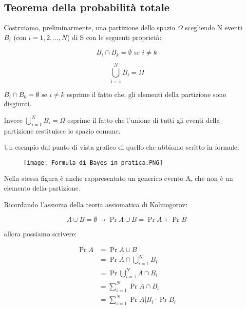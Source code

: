 \subsection{Teorema della probabilità totale} 

Costruiamo, preliminarmente, una partizione dello spazio $\Omega$ scegliendo N eventi $B_i$ (con $i = 1, 2, ..., N$) 
di S con le seguenti proprietà: 

{
    \Large 
    \begin{equation}
      B_i \cap B_k = \emptyset \text{ se } i \neq k   
    \end{equation}
}

{
    \Large 
    \begin{equation}
        \bigcup_{i = 1} ^{N} B_i = \Omega 
    \end{equation}
}

$B_i \cap B_k = \emptyset \text{ se } i \neq k$ esprime il fatto che, gli elementi della partizione sono disgiunti. \newline 

Invece $\bigcup_{i = 1} ^{N} B_i = \Omega$ esprime il fatto che l'unione di tutti gli eventi della partizione restituisce lo spazio comune. \newline 

Un esempio dal punto di vista grafico di quello che abbiamo scritto in formule: 

\begin{figure}[h]
    \centering
    \texttt{[image: Formula di Bayes in pratica.PNG]}
\end{figure} 

\newpage 

Nella stessa figura è anche rappresentato un generico evento A, che non è un elemento della partizione. \newline 

Ricordando l'assioma della teoria assiomatica di Kolmogorov: 

{
    \Large 
    \begin{equation}
        A \cup B = \emptyset 
        \rightarrow 
        \Pr{A \cup B} = \Pr{A} + \Pr{B}
    \end{equation}
}

allora possiamo scrivere: 

{
    \Large 
    \begin{equation}
        \begin{split}
            \Pr{A} 
            &= 
            \Pr{A \cup B} 
            \\ 
            &= 
            \Pr{A \cap \bigcup_{i =1}^{N} B_i}
            \\ 
            &= 
            \Pr{\bigcup_{i =1}^{N} A \cap B_i}
            \\ 
            &= 
            \sum_{i = 1}^{N}
            \Pr{A \cap B_i} 
            \\ 
            &= 
            \sum_{i = 1}^{N}
            \Pr{A | B_i} \cdot \Pr{B_i} 
        \end{split}
    \end{equation}
}

